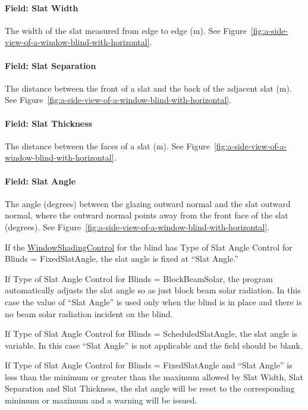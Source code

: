 \paragraph{Field: Slat Width}\label{field-slat-width}

The width of the slat measured from edge to edge (m). See Figure~\ref{fig:a-side-view-of-a-window-blind-with-horizontal}.

\paragraph{Field: Slat Separation}\label{field-slat-separation}

The distance between the front of a slat and the back of the adjacent slat (m). See Figure~\ref{fig:a-side-view-of-a-window-blind-with-horizontal}.

\paragraph{Field: Slat Thickness}\label{field-slat-thickness}

The distance between the faces of a slat (m). See Figure~\ref{fig:a-side-view-of-a-window-blind-with-horizontal}.

\paragraph{Field: Slat Angle}\label{field-slat-angle}

The angle (degrees) between the glazing outward normal and the slat outward normal, where the outward normal points away from the front face of the slat (degrees). See Figure~\ref{fig:a-side-view-of-a-window-blind-with-horizontal}.

If the \hyperref[windowpropertyshadingcontrol]{WindowShadingControl} for the blind has Type of Slat Angle Control for Blinds = FixedSlatAngle, the slat angle is fixed at ``Slat Angle.''

If Type of Slat Angle Control for Blinds = BlockBeamSolar, the program automatically adjusts the slat angle so as just block beam solar radiation. In this case the value of ``Slat Angle'' is used only when the blind is in place and there is no beam solar radiation incident on the blind.

If Type of Slat Angle Control for Blinds = ScheduledSlatAngle, the slat angle is variable. In this case ``Slat Angle'' is not applicable and the field should be blank.

If Type of Slat Angle Control for Blinds = FixedSlatAngle and ``Slat Angle'' is less than the minimum or greater than the maximum allowed by Slat Width, Slat Separation and Slat Thickness, the slat angle will be reset to the corresponding minimum or maximum and a warning will be issued.

